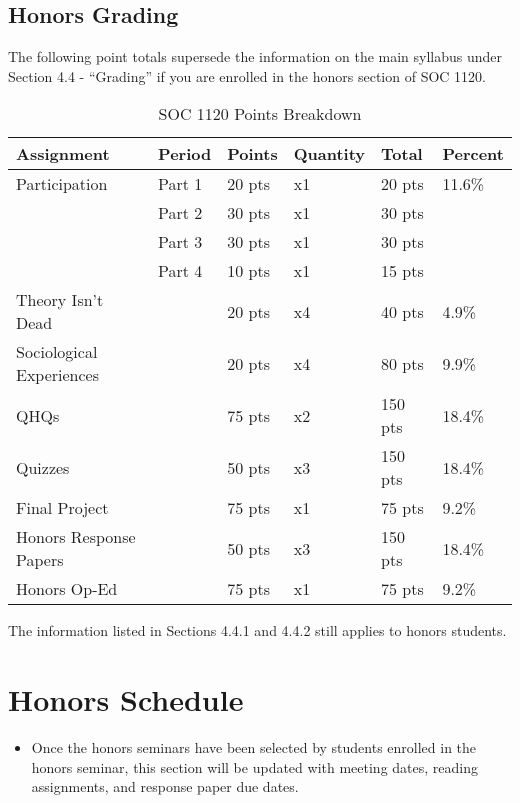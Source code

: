 \documentclass[
]{book}
\newenvironment{rmdblock}[1]
  {\begin{shaded*}
  \begin{itemize}
  \renewcommand{\labelitemi}{
    \raisebox{-.7\height}[0pt][0pt]{
      {\setkeys{Gin}{width=3em,keepaspectratio}\texttt{[image: images/\#1]}}
    }
  }
  \item
  }
  {
  \end{itemize}
  \end{shaded*}
  }
\newenvironment{rmdwarning}
  {\begin{rmdblock}{warning}}
  {\end{rmdblock}}
\begin{document}
\hypertarget{honors-grading}{%
\section{Honors Grading}\label{honors-grading}}

The following point totals supersede the information on the main syllabus under Section 4.4 - ``Grading'' if you are enrolled in the honors section of SOC 1120.

\begin{table}

\caption{\label{tab:unnamed-chunk-5}SOC 1120 Points Breakdown}
\centering
\begin{tabular}[t]{llllll}
\toprule
Assignment & Period & Points & Quantity & Total & Percent\\
\midrule
Participation & Part 1 & 20 pts & x1 & 20 pts & 11.6\%\\
 & Part 2 & 30 pts & x1 & 30 pts & \\
 & Part 3 & 30 pts & x1 & 30 pts & \\
 & Part 4 & 10 pts & x1 & 15 pts & \\
Theory Isn't Dead &  & 20 pts & x4 & 40 pts & 4.9\%\\
\addlinespace
Sociological Experiences &  & 20 pts & x4 & 80 pts & 9.9\%\\
QHQs &  & 75 pts & x2 & 150 pts & 18.4\%\\
Quizzes &  & 50 pts & x3 & 150 pts & 18.4\%\\
Final Project &  & 75 pts & x1 & 75 pts & 9.2\%\\
Honors Response Papers &  & 50 pts & x3 & 150 pts & 18.4\%\\
\addlinespace
Honors Op-Ed &  & 75 pts & x1 & 75 pts & 9.2\%\\
\bottomrule
\end{tabular}
\end{table}

The information listed in Sections 4.4.1 and 4.4.2 still applies to honors students.

\hypertarget{honors-schedule}{%
\chapter{Honors Schedule}\label{honors-schedule}}

\begin{rmdwarning}
Once the honors seminars have been selected by students enrolled in the
honors seminar, this section will be updated with meeting dates, reading
assignments, and response paper due dates.
\end{rmdwarning}

  
\end{document}
